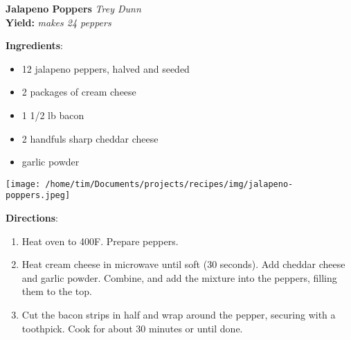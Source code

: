 \documentclass[11pt, twoside, openany]{book}
\begin{document}
\noindent\begin{minipage}[t]{\linewidth}%
{\Large\textbf{Jalapeno Poppers}} \label{jalapeno-poppers}\hfill\textit{Trey Dunn}\\
\textbf{Yield:} \textit{makes 24 peppers}\\
\noindent\begin{minipage}[t]{0.78\linewidth}%
\textbf{Ingredients}:\vspace{-3mm}
\begin{multicols}{2}
\begin{itemize}\setlength\itemsep{-1mm}
\item 12 jalapeno peppers, halved and seeded
\item 2 packages of cream cheese
\item 1 1/2 lb bacon
\item 2 handfuls sharp cheddar cheese
\item garlic powder
\end{itemize}
\end{multicols}
\end{minipage}
\noindent\begin{minipage}[t]{0.18\linewidth}
\centering \strut\vspace*{-\baselineskip}\newline
\texttt{[image: /home/tim/Documents/projects/recipes/img/jalapeno-poppers.jpeg]}\\
\end{minipage}\vspace{3mm}
\textbf{Directions}:
\vspace{-3mm}\begin{enumerate}\setlength\itemsep{-1mm}
\item Heat oven to 400F. Prepare peppers.
\item Heat cream cheese in microwave until soft (30 seconds). Add cheddar cheese and garlic powder. Combine, and add the mixture into the peppers, filling them to the top.
\item Cut the bacon strips in half and wrap around the pepper, securing with a toothpick. Cook for about 30 minutes or until done.
\end{enumerate}
\end{minipage}\vspace{8mm}
\end{document}
